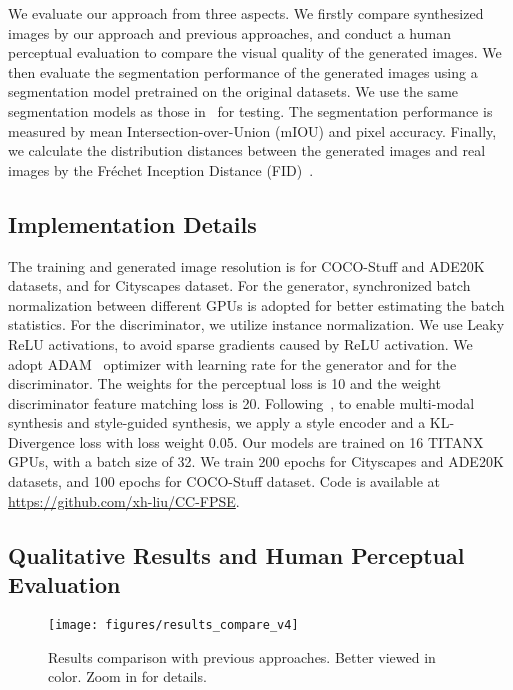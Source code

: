 \documentclass{article}
\begin{document}
We evaluate our approach from three aspects.
We firstly compare synthesized images by our approach and previous approaches, and conduct a human perceptual evaluation to compare the visual quality of the generated images.
We then evaluate the segmentation performance of the generated images using a segmentation model pretrained on the original datasets.
We use the same segmentation models as those in~\cite{park2019semantic} for testing. The segmentation performance is measured by mean Intersection-over-Union (mIOU) and pixel accuracy.
Finally, we calculate the distribution distances between the generated images and real images by the Fr\'echet Inception Distance (FID)~\cite{heusel2017gans}.


\subsection{Implementation Details}
The training and generated image resolution is  for COCO-Stuff and ADE20K datasets, and  for Cityscapes dataset.
For the generator, synchronized batch normalization between different GPUs is adopted for better estimating the batch statistics.
For the discriminator, we utilize instance normalization.
We use Leaky ReLU activations, to avoid sparse gradients caused by ReLU activation.
We adopt ADAM~\cite{kingma2014adam} optimizer with learning rate  for the generator and  for the discriminator.
The weights for the perceptual loss  is 10 and the weight discriminator feature matching loss  is 20.
Following~\cite{park2019semantic}, to enable multi-modal synthesis and style-guided synthesis, we apply a style encoder and a KL-Divergence loss with loss weight 0.05.
Our models are trained on 16 TITANX GPUs, with a batch size of 32.
We train 200 epochs for Cityscapes and ADE20K datasets, and 100 epochs for COCO-Stuff dataset.
Code is available at \href{https://github.com/xh-liu/CC-FPSE}{https://github.com/xh-liu/CC-FPSE}.

\subsection{Qualitative Results and Human Perceptual Evaluation}
\begin{figure}[t]
\centering
\texttt{[image: figures/results\_compare\_v4]}
\caption{Results comparison with previous approaches. Better viewed in color. Zoom in for details.}
\label{fig:result_compare}
\end{figure}
\end{document}
